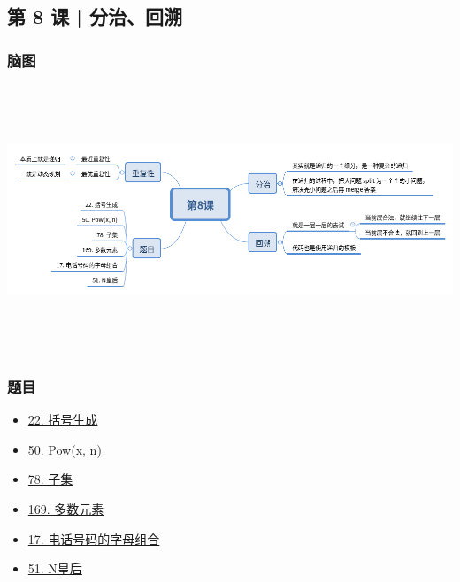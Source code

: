 \subsection{第 8 课 | 分治、回溯}

\subsubsection{脑图}

\includegraphics[width=170mm,height=80mm]{images/第8课.png}

\subsubsection{题目}

\begin{itemize}
  \item \hyperref[leetcode:22]{22. 括号生成}
  \item \hyperref[leetcode:50]{50. Pow(x, n)}
  \item \hyperref[leetcode:78]{78. 子集}
  \item \hyperref[leetcode:169]{169. 多数元素}
  \item \hyperref[leetcode:17]{17. 电话号码的字母组合}
  \item \hyperref[leetcode:51]{51. N皇后}
\end{itemize}
